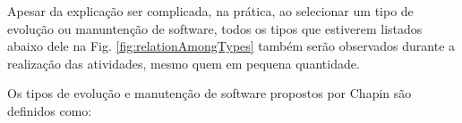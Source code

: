 Apesar da explicação ser complicada, na prática, ao selecionar um tipo de evolução ou manuntenção 
de software, todos os tipos que estiverem listados abaixo dele na Fig. \ref{fig:relationAmongTypes} também serão observados 
durante a realização das atividades, mesmo quem em pequena quantidade.


Os tipos de evolução e manutenção de software propostos por Chapin são definidos como:

